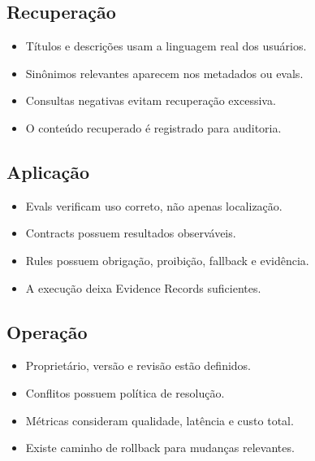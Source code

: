\documentclass[
  10pt,
  a4paper,
  oneside]{book}
\providecommand{\tightlist}{%
  \setlength{\itemsep}{0pt}\setlength{\parskip}{0pt}}
\begin{document}
\hypertarget{recuperauxe7uxe3o}{%
\subsection{Recuperação}\label{recuperauxe7uxe3o}}

\begin{itemize}
\tightlist
\item[$\square$]
  Títulos e descrições usam a linguagem real dos usuários.
\item[$\square$]
  Sinônimos relevantes aparecem nos metadados ou evals.
\item[$\square$]
  Consultas negativas evitam recuperação excessiva.
\item[$\square$]
  O conteúdo recuperado é registrado para auditoria.
\end{itemize}

\hypertarget{aplicauxe7uxe3o}{%
\subsection{Aplicação}\label{aplicauxe7uxe3o}}

\begin{itemize}
\tightlist
\item[$\square$]
  Evals verificam uso correto, não apenas localização.
\item[$\square$]
  Contracts possuem resultados observáveis.
\item[$\square$]
  Rules possuem obrigação, proibição, fallback e evidência.
\item[$\square$]
  A execução deixa Evidence Records suficientes.
\end{itemize}

\hypertarget{operauxe7uxe3o}{%
\subsection{Operação}\label{operauxe7uxe3o}}

\begin{itemize}
\tightlist
\item[$\square$]
  Proprietário, versão e revisão estão definidos.
\item[$\square$]
  Conflitos possuem política de resolução.
\item[$\square$]
  Métricas consideram qualidade, latência e custo total.
\item[$\square$]
  Existe caminho de rollback para mudanças relevantes.
\end{itemize}
\end{document}
